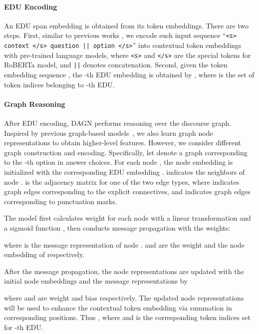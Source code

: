 \documentclass[11pt]{article}
\newcommand{\moe}[1]{{\color{black} #1}}
\begin{document}
\paragraph{EDU Encoding}
An EDU span embedding is obtained from its token embeddings.
\moe{
There are two steps. 
First, similar to previous works \cite{yu2020reclor,liu2020logiqa},} 
we encode such input sequence ``\texttt{<s> context </s> question || option </s>}'' into contextual token embeddings with pre-trained language models,
where \texttt{<s>} and \texttt{</s>} are the special tokens for RoBERTa \cite{liu2019roberta} model, and \texttt{||} denotes concatenation. \moe{Second,} given the token embedding sequence , the -th EDU embedding is obtained by , where  is the set of token indices belonging to -th EDU.




\paragraph{\moe{Graph Reasoning}} \moe{After EDU encoding, DAGN performs reasoning over the discourse graph. 
Inspired by previous graph-based models~\cite{ran2019numnet,chen2020question},
we also learn graph node representations to obtain higher-level features. However, we consider different graph construction and encoding.
Specifically, let  denote a graph corresponding to the -th option in answer choices.
For each node , the node embedding  is initialized with the corresponding EDU embedding . 
 indicates the neighbors of node .
 is the adjacency matrix for one of the two edge types, 
where  indicates graph edges corresponding to the explicit connectives, 
and  indicates graph edges corresponding to punctuation marks.}

The model first calculates weight  for each node with a linear transformation and a sigmoid function , then conducts message propagation with the weights:

\noindent where  is the message representation of node . 
 and  are the weight and the node embedding of  respectively.








After the message propagation, the node representations are updated with the initial node embeddings and the message representations by

where  and  are weight and bias respectively.
The updated node representations  will be used to enhance the contextual token embedding via summation in corresponding positions. Thus , where  and  is the corresponding token indices set for -th EDU.
\end{document}
